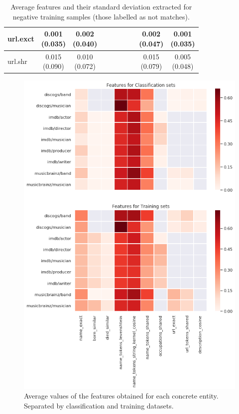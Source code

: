 \documentclass[epsfig,a4paper,11pt,titlepage,twoside,openany]{book}
\begin{document}
\begin{table}[H]
\begin{tabular}{l|c|c|c|c|c|c|c|c|c|}
\multicolumn{1}{|l|}{url.exct}                           & \makecell{0.001 \\ (0.035)}  & \makecell{0.002 \\ (0.040)} &              &              &              &              &              & \makecell{0.002 \\ (0.047)}    & \makecell{0.001 \\ (0.035)}   \\ \hline
\multicolumn{1}{|l|}{url.shr}                  & \makecell{0.015 \\ (0.090)}  & \makecell{0.010 \\ (0.072)} &              &              &              &              &              & \makecell{0.015 \\ (0.079)}    & \makecell{0.005 \\ (0.048)}   \\ \hline
\end{tabular}
\caption{Average features and their standard deviation extracted for negative training samples (those labelled as not matches).}
\label{tab:features-viz-average-std-negative}
\end{table}



\begin{figure}[H]
  \centering \includegraphics[width=.8\textwidth]{feature_heatmap_classification_and_training} 
  \caption{Average values of the features obtained for each concrete entity. Separated by classification and training datasets.}
  \label{fig:average-features-classification-training}
\end{figure}
\end{document}

